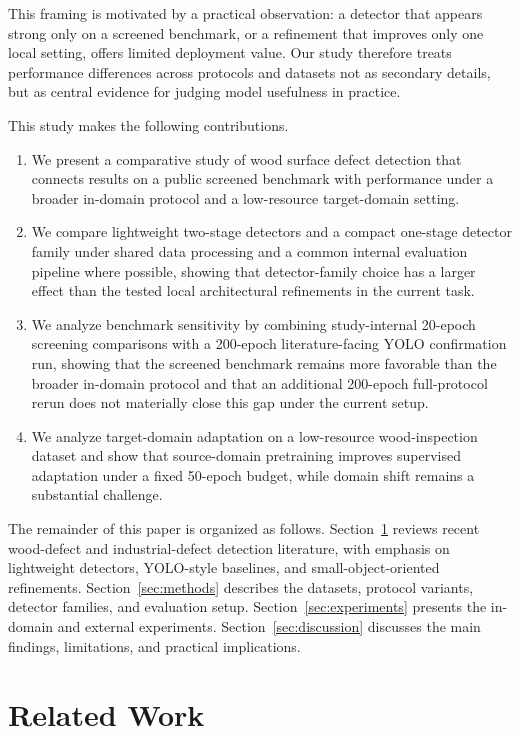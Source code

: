 This framing is motivated by a practical observation: a detector that appears strong only on a screened benchmark, or a refinement that improves only one local setting, offers limited deployment value. Our study therefore treats performance differences across protocols and datasets not as secondary details, but as central evidence for judging model usefulness in practice.

This study makes the following contributions.

\begin{enumerate}[leftmargin=1.5em]
  \item We present a comparative study of wood surface defect detection that connects results on a public screened benchmark with performance under a broader in-domain protocol and a low-resource target-domain setting.
  \item We compare lightweight two-stage detectors and a compact one-stage detector family under shared data processing and a common internal evaluation pipeline where possible, showing that detector-family choice has a larger effect than the tested local architectural refinements in the current task.
  \item We analyze benchmark sensitivity by combining study-internal 20-epoch screening comparisons with a 200-epoch literature-facing YOLO confirmation run, showing that the screened benchmark remains more favorable than the broader in-domain protocol and that an additional 200-epoch full-protocol rerun does not materially close this gap under the current setup.
  \item We analyze target-domain adaptation on a low-resource wood-inspection dataset and show that source-domain pretraining improves supervised adaptation under a fixed 50-epoch budget, while domain shift remains a substantial challenge.
\end{enumerate}

The remainder of this paper is organized as follows. Section~\ref{sec:related-work} reviews recent wood-defect and industrial-defect detection literature, with emphasis on lightweight detectors, YOLO-style baselines, and small-object-oriented refinements. Section~\ref{sec:methods} describes the datasets, protocol variants, detector families, and evaluation setup. Section~\ref{sec:experiments} presents the in-domain and external experiments. Section~\ref{sec:discussion} discusses the main findings, limitations, and practical implications.

\section{Related Work}
\label{sec:related-work}

